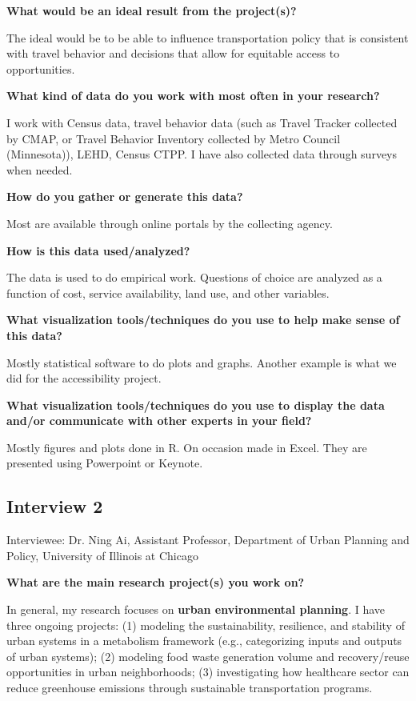 \documentclass{egpubl}
\begin{document}
\textbf{What would be an ideal result from the project(s)?}

The ideal would be to be able to influence transportation policy that is consistent with travel behavior and decisions that allow for equitable access to opportunities.

\textbf{What kind of data do you work with most often in your research?}

I work with Census data, travel behavior data (such as Travel Tracker collected by CMAP, or Travel Behavior Inventory collected by Metro Council (Minnesota)), LEHD, Census CTPP. I have also collected data through surveys when needed.

\textbf{How do you gather or generate this data?}

Most are available through online portals by the collecting agency.

\textbf{How is this data used/analyzed?}

The data is used to do empirical work. Questions of choice are analyzed as a function of cost, service availability, land use, and other variables.

\textbf{What visualization tools/techniques do you use to help make sense of this data?}

Mostly statistical software to do plots and graphs. Another example is what we did for the accessibility project.

\textbf{What visualization tools/techniques do you use to display the data and/or communicate with other experts in your field?}

Mostly figures and plots done in R. On occasion made in Excel. They are presented using Powerpoint or Keynote.

\subsection{Interview 2}

Interviewee: Dr. Ning Ai, Assistant Professor, Department of Urban Planning and Policy, University of Illinois at Chicago

\textbf{What are the main research project(s) you work on?}

In general, my research focuses on \textbf{urban environmental planning}. I have three ongoing projects: (1) modeling the sustainability, resilience, and stability of urban systems in a metabolism framework (e.g., categorizing inputs and outputs of urban systems); (2) modeling food waste generation volume and recovery/reuse opportunities in urban neighborhoods; (3) investigating how healthcare sector can reduce greenhouse emissions through sustainable transportation programs.
\end{document}
